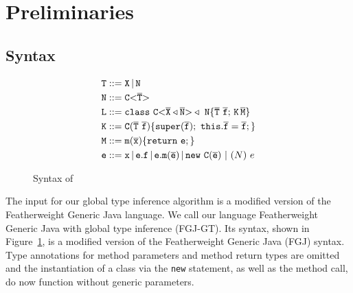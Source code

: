 \section{Preliminaries}
\label{sec:preliminaries}
\subsection{Syntax}
\begin{figure}[tp]
\begin{align*}
  {\tt T} &::= {\tt X} \, | \, {\tt N} \\
  {\tt N} &::= \mathtt{C {\tt <} \overline{\tt T} {\tt >} }\\
  {\tt L} &::= \mathtt{class} \ \mathtt{C {\tt <} \overline{\tt X} \triangleleft \overline{\tt N} {\tt >} }
             \triangleleft \ {\tt N} \{ \overline{\tt T} \ \overline{\tt f}; \,{\tt K} \, \overline{\tt M} \} \\
  {\tt K} &::= {\tt C}(\overline{\tt T} \ \overline{\tt f})\{\mathtt{super}(\overline{\tt f}); \ \mathtt{this}.\overline{\tt f}=\overline{\tt f};\} \\
  {\tt M} &::= \mathtt{m}(\overline{\tt x})\{ \mathtt{ return}\ {\tt e}; \} \\
  {\tt e} &::= {\tt x} \, | \, {\tt e}.{\tt f} \, | \,
             {\tt e}.\mathtt{m}(\overline{\tt e}) \, | \, \mathtt{new}\ \mathtt{C}(\overline{\tt e})
             \ |\ (N)\ e
\end{align*}
  \caption{Syntax of \TFGJ}
  \label{fig:syntax-tfgj}
\end{figure}
The input for our global type inference algorithm is a modified version of the Featherweight Generic Java language.
We call our language Featherweight Generic Java with global type inference (FGJ-GT).
Its syntax, shown in Figure~\ref{fig:syntax-tfgj}, is a modified version of the Featherweight Generic Java (FGJ) syntax. 
Type annotations for method parameters and method return types are omitted %
and the instantiation of a class via the \texttt{new} statement, as well as the method call, do now function without generic parameters.

